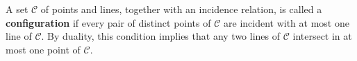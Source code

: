 A set $\mathcal{C}$ of points and lines, together with an incidence relation, is called a \textbf{configuration} if every pair of distinct points of $\mathcal{C}$ are incident with at most one line of $\mathcal{C}$. By duality, this condition implies that any two lines of $\mathcal{C}$ intersect in at most one point of $\mathcal{C}$.

